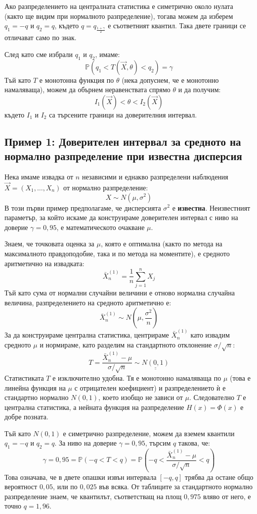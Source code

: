 \documentclass{article}
\begin{document}
Ако разпределението на централната статистика е симетрично около нулата (както ще видим при нормалното разпределение), тогава можем да изберем $q_1 = -q$ и $q_2 = q$, където $q = q_{\frac{1+\gamma}{2}}$ е съответният квантил. Така двете граници се отличават само по знак.

След като сме избрали $q_1$ и $q_2$, имаме:
\[
\mathbb{P}(q_1 < T(\vec{X}, \theta) < q_2) = \gamma
\]
Тъй като $T$ е монотонна функция по $\theta$ (нека допуснем, че е монотонно намаляваща), можем да обърнем неравенствата спрямо $\theta$ и да получим:
\[
I_1(\vec{X}) < \theta < I_2(\vec{X})
\]
където $I_1$ и $I_2$ са търсените граници на доверителния интервал.

\subsection{Пример 1: Доверителен интервал за средното на нормално разпределение при известна дисперсия}
Нека имаме извадка от $n$ независими и еднакво разпределени наблюдения $\vec{X} = (X_1, \dots, X_n)$ от нормално разпределение:
\[
X \sim N(\mu, \sigma^2)
\]
В този първи пример предполагаме, че дисперсията $\sigma^2$ е \textbf{известна}. Неизвестният параметър, за който искаме да конструираме доверителен интервал с ниво на доверие $\gamma = 0,95$, е математическото очакване $\mu$.

Знаем, че точковата оценка за $\mu$, която е оптимална (както по метода на максималното правдоподобие, така и по метода на моментите), е средното аритметично на извадката:
\[
\bar{X}_n^{(1)} = \frac{1}{n} \sum_{j=1}^n X_j
\]
Тъй като сума от нормални случайни величини е отново нормална случайна величина, разпределението на средното аритметично е:
\[
\bar{X}_n^{(1)} \sim N\left(\mu, \frac{\sigma^2}{n}\right)
\]
За да конструираме централна статистика, центрираме $\bar{X}_n^{(1)}$ като извадим средното $\mu$ и нормираме, като разделим на стандартното отклонение $\sigma / \sqrt{n}$:
\[
T = \frac{\bar{X}_n^{(1)} - \mu}{\sigma / \sqrt{n}} \sim \underline{\underline{N(0, 1)}}
\]
Статистиката $T$ е изключително удобна. Тя е монотонно намаляваща по $\mu$ (това е линейна функция на $\mu$ с отрицателен коефициент) и разпределението ѝ е стандартно нормално $N(0, 1)$, което изобщо не зависи от $\mu$. Следователно $T$ е централна статистика, а нейната функция на разпределение $H(x) = \Phi(x)$ е добре позната.

Тъй като $N(0,1)$ е симетрично разпределение, можем да вземем квантили $q_1 = -q$ и $q_2 = q$. За ниво на доверие $\gamma = 0,95$, търсим $q$ такова, че:
\[
\gamma = 0,95 = \mathbb{P}(-q < T < q) = \mathbb{P}\left(-q < \frac{\bar{X}_n^{(1)} - \mu}{\sigma / \sqrt{n}} < q\right)
\]
Това означава, че в двете опашки извън интервала $[-q, q]$ трябва да остане общо вероятност $0,05$, или по $0,025$ във всяка. От таблиците за стандартното нормално разпределение знаем, че квантилът, съответстващ на площ $0,975$ вляво от него, е точно $q = 1,96$.
\end{document}
